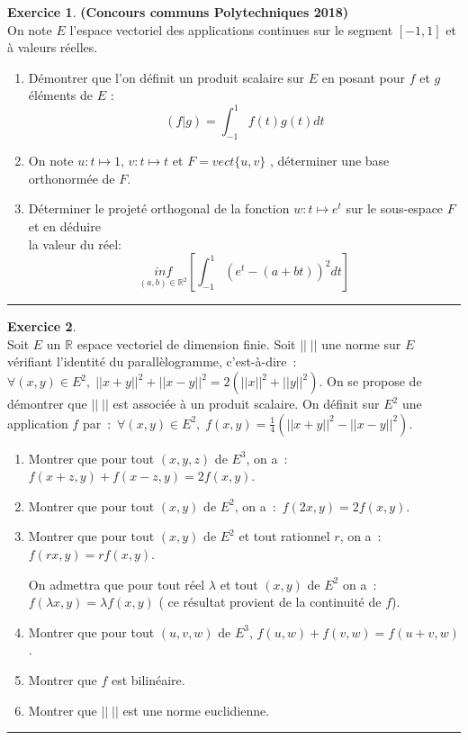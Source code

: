 \documentclass[a4paper,10pt]{article}
\theoremstyle{definition}
\theoremstyle{definition}
\newtheorem{exo}{Exercice}
\newcommand{\R}{\mathbb{R}}
\begin{document}
\begin{exo}\textbf{(Concours communs Polytechniques 2018)}\quad\\[0.25cm]
	On note $E$ l’espace vectoriel des applications continues sur le segment $[-1,1]$ et à valeurs réelles.
\begin{enumerate}
	\item Démontrer que l’on définit un produit scalaire sur $E$ en posant pour $f$ et $g$ éléments de $E$ :
	$$\left(f|g\right) = \int_{-1}^{1}f(t)g(t)dt$$
	\item On note $u : t \mapsto1$, $v : t \mapsto t$ et $F = vect \{ u , v \}$ , déterminer une base orthonormée de $F$.
	\item Déterminer le projeté orthogonal de la fonction $w : t \mapsto e^t$ sur le sous-espace $F$ et en déduire \\la valeur du réel:
	$$\underset{(a,b)\in\R^2}{inf}\left[\int_{-1}^{1}\left(e^t-(a+bt)\right)^2dt\right]$$
\end{enumerate}
\centering
\rule{1\linewidth}{0.6pt}
\end{exo}

\begin{exo}\quad\\[0.25cm]
Soit $E$ un $\R$ espace vectoriel de dimension finie. Soit $||\;||$ une norme sur $E$ vérifiant l'identité du parallèlogramme, c'est-à-dire~:~$\forall(x,y)\in E^2,\;||x+y||^2+||x-y||^2=2(||x||^2+||y||^2)$. On se propose de démontrer que $||\;||$ est associée à un produit scalaire.
On définit sur $E^2$ une application $f$ par~:~$\forall(x,y)\in E^2,\;f(x,y)=\frac{1}{4}(||x+y||^2-||x-y||^2)$.
\begin{enumerate}
	\item  Montrer que pour tout $(x,y,z)$ de $E^3$, on a~:~$f(x+z,y)+f(x-z,y)=2f(x,y)$.
	\item  Montrer que pour tout $(x,y)$ de $E^2$, on a~:~$f(2x,y)=2f(x,y)$.
	\item  Montrer que pour tout $(x,y)$ de $E^2$ et tout rationnel $r$, on a~:~$f(rx,y)=rf(x,y)$.
	
	On admettra que pour tout réel $\lambda$ et tout $(x,y)$ de $E^2$ on a~:~$f(\lambda x,y)=\lambda f(x,y)$ ( ce résultat provient de la continuité de $f$).
	\item  Montrer que pour tout $(u,v,w)$ de $E^3$, $f(u,w)+f(v,w)=f(u+v,w)$.
	\item  Montrer que $f$ est bilinéaire.
	\item  Montrer que $||\;||$ est une norme euclidienne.
\end{enumerate}

\centering
\rule{1\linewidth}{0.6pt}
\end{exo}			
\end{document}
